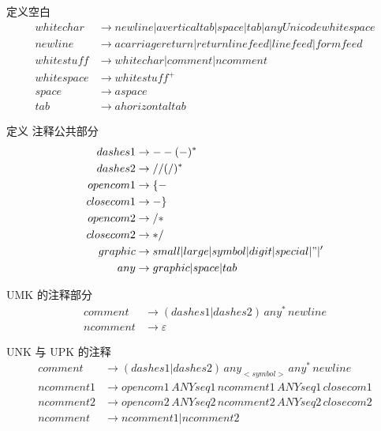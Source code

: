 \documentclass{ctexart}
\begin{document}
定义空白
\begin{align*}
whitechar &\rightarrow newline|\mathit{a vertical tab}|space|tab|\mathit{any Unicode whitespace} \\
newline &\rightarrow \mathit{a carriage return}|\mathit{return linefeed}|\mathit{linefeed}|\mathit{formfeed} \\
whitestuff &\rightarrow whitechar|comment|ncomment \\
whitespace &\rightarrow whitestuff^+ \\
space &\rightarrow \mathit{a space} \\
tab &\rightarrow \mathit{a horizontal tab}
\end{align*}

定义 注释公共部分
\begin{align*}
dashes1 &\rightarrow --(-)^* \\
dashes2 &\rightarrow //(/)^* \\
opencom1 &\rightarrow \{- \\
closecom1 &\rightarrow -\} \\
opencom2 &\rightarrow /* \\
closecom2 &\rightarrow */ \\
graphic &\rightarrow small|large|symbol|digit|special|"|' \\
any &\rightarrow graphic|space|tab \\
\end{align*}

UMK 的注释部分
\begin{align*}
comment &\rightarrow (dashes1|dashes2)\,any^*\,newline \\
ncomment &\rightarrow \varepsilon
\end{align*}

UNK 与 UPK 的注释
\begin{align*}
comment &\rightarrow (dashes1|dashes2)\,any_{<symbol>}\,any^*\,newline \\
ncomment1 &\rightarrow opencom1\,ANYseq1\,{ncomment1\,ANYseq1}\,closecom1 \\
ncomment2 &\rightarrow opencom2\,ANYseq2\,{ncomment2\,ANYseq2}\,closecom2 \\
ncomment &\rightarrow ncomment1|ncomment2
\end{align*}
\end{document}
